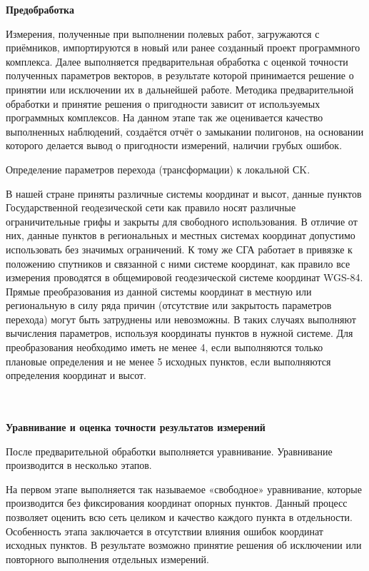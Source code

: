 \documentclass[a4paper]{article}
\begin{document}
\begin{newpage}
{        \par\textbf{Предобработка}
        \par Измерения, полученные при выполнении полевых работ, загружаются с приёмников, импортируются в новый или ранее созданный проект программного комплекса. Далее выполняется предварительная обработка с оценкой точности полученных параметров векторов, в результате которой принимается решение о принятии или исключении их в дальнейшей работе. Методика предварительной обработки и принятие решения о пригодности зависит от используемых программных комплексов. На данном этапе так же оценивается качество выполненных наблюдений, создаётся отчёт о замыкании полигонов, на основании которого делается вывод о пригодности измерений, наличии грубых ошибок.
        \par Определение параметров перехода (трансформации) к локальной СK.
        \par В нашей стране приняты различные системы координат и высот, данные пунктов Государственной геодезической сети как правило носят различные ограничительные грифы и закрыты для свободного использования. В отличие от них, данные пунктов в региональных и местных системах координат допустимо использовать без значимых ограничений. К тому же СГА работает в привязке к положению спутников и связанной с ними системе координат, как правило все измерения проводятся в общемировой геодезической системе координат WGS-84. Прямые преобразования из данной системы координат в местную или региональную в силу ряда причин (отсутствие или закрытость параметров перехода) могут быть затруднены или невозможны. В таких случаях выполняют вычисления параметров, используя координаты пунктов в нужной системе. Для преобразования необходимо иметь не менее 4, если выполняются только плановые определения и не менее 5 исходных пунктов, если выполняются определения координат и высот.\\
        \\
        \\
        \par\textbf{Уравнивание и оценка точности результатов измерений}
        \par После предварительной обработки выполняется уравнивание. Уравнивание производится в несколько этапов.
        \par На первом этапе выполняется так называемое «свободное» уравнивание, которые производится без фиксирования координат опорных пунктов. Данный процесс позволяет оценить всю сеть целиком и качество каждого пункта в отдельности. Особенность этапа заключается в отсутствии влияния ошибок координат исходных пунктов. В результате возможно принятие решения об исключении или повторного выполнения отдельных измерений.
}
\end{newpage}
\end{document}
